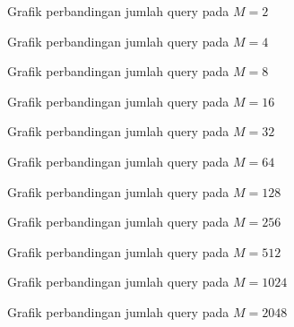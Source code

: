 \begin{figure}
\centering
{}
\caption{Grafik perbandingan jumlah query pada $M=2$}
\label{fig:graph_query1}
\end{figure}

\begin{figure}
\centering
{}
\caption{Grafik perbandingan jumlah query pada $M=4$}
\label{fig:graph_query2}
\end{figure}

\begin{figure}
\centering
{}
\caption{Grafik perbandingan jumlah query pada $M=8$}
\label{fig:graph_query3}
\end{figure}

\begin{figure}
\centering
{}
\caption{Grafik perbandingan jumlah query pada $M=16$}
\label{fig:graph_query4}
\end{figure}

\begin{figure}
\centering
{}
\caption{Grafik perbandingan jumlah query pada $M=32$}
\label{fig:graph_query5}
\end{figure}

\begin{figure}
\centering
{}
\caption{Grafik perbandingan jumlah query pada $M=64$}
\label{fig:graph_query6}
\end{figure}

\begin{figure}
\centering
{}
\caption{Grafik perbandingan jumlah query pada $M=128$}
\label{fig:graph_query7}
\end{figure}

\begin{figure}
\centering
{}
\caption{Grafik perbandingan jumlah query pada $M=256$}
\label{fig:graph_query8}
\end{figure}

\begin{figure}
\centering
{}
\caption{Grafik perbandingan jumlah query pada $M=512$}
\label{fig:graph_query9}
\end{figure}

\begin{figure}
\centering
{}
\caption{Grafik perbandingan jumlah query pada $M=1024$}
\label{fig:graph_query10}
\end{figure}

\begin{figure}
\centering
{}
\caption{Grafik perbandingan jumlah query pada $M=2048$}
\label{fig:graph_query11}
\end{figure}

